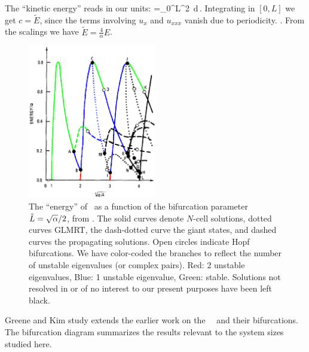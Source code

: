 The ``kinetic energy'' reads in our units:
\beq
	=\int_0^{L}^2\, d\,.
\eeq
Integrating  in $[0,L]$ we get $c=\tilde{E}$,
since the terms involving $u_x$ and $u_{xxx}$ vanish due to periodicity.
.
From the scalings  we have $\tilde{E}=\frac{4}{\alpha}E$.


\begin{figure}[t]
\centering
\includegraphics[width=0.5\textwidth]{figs/GreeneKimBifColor.eps}
\caption{
	{\small
The ``energy'' of \eqva\ as a function of the bifurcation
parameter $\tilde{L}=\sqrt{\alpha}/2$, from .
The solid curves denote $N$-cell solutions,
dotted curves GLMRT, the dash-dotted curve the
giant states, and dashed curves the propagating solutions.
Open circles indicate Hopf bifurcations. 
We have color-coded the branches to reflect the number of unstable
eigenvalues (or complex pairs). Red: 2 unstable eigenvalues, Blue: 1
unstable eigenvalue, Green: stable. Solutions not 
resolved in  or of no interest
to our present purposes have been left black.
        } %
        }
\label{fig:GreeneKim}
\end{figure}

Greene and Kim study extends the earlier work
on the \KS\ \eqva\ and their bifurcations. The 
bifurcation diagram  summarizes the results
relevant to the system sizes studied here. 

